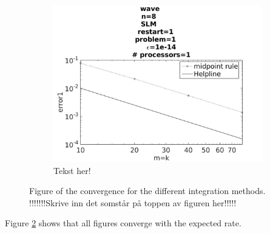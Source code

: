 \begin{figure}[H]
        \begin{subfigure}[b]{0.30\textwidth}
                \includegraphics[width=\textwidth]{../MATLAB/fig/intconvmid.jpg}
                \caption{ Tekst her! }
                \label{fig:intconvmid}
        \end{subfigure}
        \caption{Figure of the convergence for the different integration methods. !!!!!!!Skrive inn det somstår på toppen av figuren her!!!!! }
        \label{fig:intconv}
\end{figure}
Figure \ref{fig:intconv} shows that all figures converge with the expected rate.


